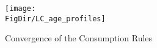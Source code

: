 \hypertarget{LC_age_profiles}{}
\begin{figure}[tbp]
\centerline{\texttt{[image: \\FigDir/LC\_age\_profiles]}}
\caption{Convergence of the Consumption Rules}
\label{fig:LS_age_profiles}
\end{figure}